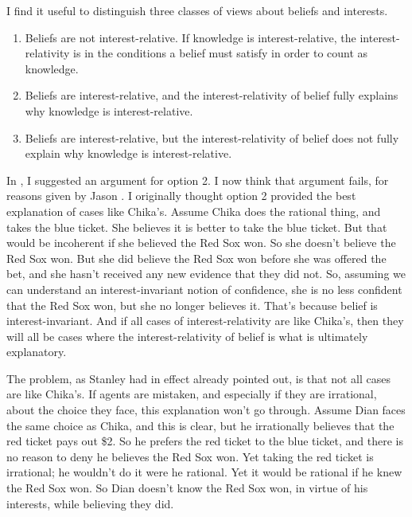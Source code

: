 I find it useful to distinguish three classes of views about beliefs and interests.

\begin{enumerate}
\item Beliefs are not interest-relative. If knowledge is interest-relative, the interest-relativity is in the conditions a belief must satisfy in order to count as knowledge.

\item Beliefs are interest-relative, and the interest-relativity of belief fully explains why knowledge is interest-relative.

\item Beliefs are interest-relative, but the interest-relativity of belief does not fully explain why knowledge is interest-relative.

\end{enumerate}
In  \citet{Weatherson2005}, I suggested an argument for option 2. I now think that argument fails, for reasons given by Jason  \citet{Stanley2005}. I originally thought option 2 provided the best explanation of cases like Chika's. Assume Chika does the rational thing, and takes the blue ticket. She believes it is better to take the blue ticket. But that would be incoherent if she believed the Red Sox won. So she doesn't believe the Red Sox won. But she did believe the Red Sox won before she was offered the bet, and she hasn't received any new evidence that they did not. So, assuming we can understand an interest-invariant notion of confidence, she is no less confident that the Red Sox won, but she no longer believes it. That's because belief is interest-invariant. And if all cases of interest-relativity are like Chika's, then they will all be cases where the interest-relativity of belief is what is ultimately explanatory.

The problem, as Stanley had in effect already pointed out, is that not all cases are like Chika's. If agents are mistaken, and especially if they are irrational, about the choice they face, this explanation won't go through. Assume Dian faces the same choice as Chika, and this is clear, but he irrationally believes that the red ticket pays out \$2. So he prefers the red ticket to the blue ticket, and there is no reason to deny he believes the Red Sox won. Yet taking the red ticket is irrational; he wouldn't do it were he rational. Yet it would be rational if he knew the Red Sox won. So Dian doesn't know the Red Sox won, in virtue of his interests, while believing they did.

